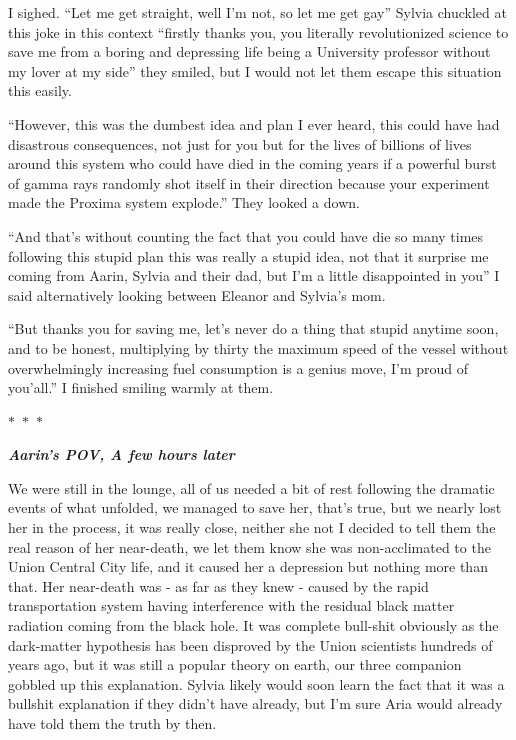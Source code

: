 \documentclass[colorlinks,12pt,a4paper]{book}
\newcommand\sep{\begin{center}
  \boldmath $\ast$~$\ast$~$\ast$
\end{center}}
\begin{document}
 I sighed. “Let me get straight, well I'm not, so let me get gay” Sylvia chuckled at this joke in this context “firstly 
 thanks you, you literally revolutionized science to save me from a boring and depressing life being a University professor 
 without my lover at my side” they smiled, but I would not let them escape this situation this easily.\par
 \bigskip
 
 “However, this was the dumbest idea and plan I ever heard, this could have had disastrous consequences, not just for 
 you but for the lives of billions of lives around this system who could have died in the coming years if a powerful
  burst of gamma rays randomly shot itself in their direction because your experiment made the Proxima system explode.”
   They looked a down.\par
   \bigskip
 
 “And that's without counting the fact that you could have die so many times following this stupid plan this was really 
 a stupid idea, not that it surprise me coming from Aarin, Sylvia and their dad, but I'm a little disappointed in you” 
 I said alternatively looking between Eleanor and Sylvia's mom.\par
 \bigskip
 
 “But thanks you for saving me, let's never do a thing that stupid anytime soon, and to be honest, multiplying by 
 thirty the maximum speed of the vessel without overwhelmingly increasing fuel consumption is a genius move, I'm proud 
 of you'all.” I finished smiling warmly at them.
 
 \sep
 
 \textit{\textbf{Aarin's POV, A few hours later}}\par
 \bigskip
 
 We were still in the lounge, all of us needed a bit of rest following the dramatic events of what unfolded, we managed to 
 save her, that's true, but we nearly lost her in the process, it was really close, neither she not I decided to tell 
 them the real reason of her near-death, we let them know she was non-acclimated to the Union Central City life, and it 
 caused her a depression but nothing more than that. Her near-death was - as far as they knew - caused by the rapid 
 transportation system having interference with the residual black matter radiation coming from the black hole. It 
 was complete bull-shit obviously as the dark-matter hypothesis has been disproved by the Union scientists hundreds of 
 years ago, but it was still a popular theory on earth, our three companion gobbled up this explanation. Sylvia 
 likely would soon learn the fact that it was a bullshit explanation if they didn't have already, but I'm sure Aria 
 would already have told them the truth by then.\par
 \bigskip
 
\end{document}
